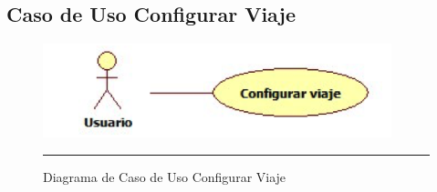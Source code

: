 \subsection{Caso de Uso Configurar Viaje}

\begin{figure}[htbp]
	\centering
		\includegraphics[width=0.9\textwidth]{Figuras/cuConfigurarViaje.png}
		\rule{30em}{0.5pt}
	\caption[Diagrama de Caso de Uso Configurar Viaje]{Diagrama de Caso de Uso Configurar Viaje}
	\label{fig:cuConfigurarViaje}
\end{figure}

